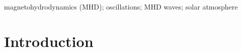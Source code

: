 \documentclass[authoryear,final,1p]{elsarticle}
\begin{document}
\begin{keyword}
magnetohydrodynamics (MHD); oscillations; MHD waves; solar atmosphere
\end{keyword}
\maketitle


\section{Introduction}
\setcounter{equation}{0}

\end{document}
